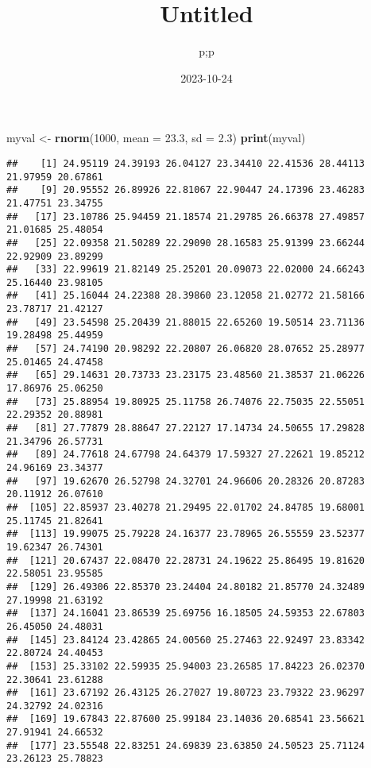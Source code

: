 \documentclass[
]{article}
\title{Untitled}
\author{p;p}
\date{2023-10-24}
\newenvironment{Shaded}{\begin{snugshade}}{\end{snugshade}}
\newcommand{\AttributeTok}[1]{\textcolor[rgb]{0.13,0.29,0.53}{#1}}
\newcommand{\DecValTok}[1]{\textcolor[rgb]{0.00,0.00,0.81}{#1}}
\newcommand{\FloatTok}[1]{\textcolor[rgb]{0.00,0.00,0.81}{#1}}
\newcommand{\FunctionTok}[1]{\textcolor[rgb]{0.13,0.29,0.53}{\textbf{#1}}}
\newcommand{\NormalTok}[1]{#1}
\newcommand{\OtherTok}[1]{\textcolor[rgb]{0.56,0.35,0.01}{#1}}
\begin{document}
\maketitle

\begin{Shaded}
\begin{Highlighting}[]
\NormalTok{myval }\OtherTok{\textless{}{-}} \FunctionTok{rnorm}\NormalTok{(}\DecValTok{1000}\NormalTok{, }\AttributeTok{mean =} \FloatTok{23.3}\NormalTok{, }\AttributeTok{sd =} \FloatTok{2.3}\NormalTok{)}
\FunctionTok{print}\NormalTok{(myval)}
\end{Highlighting}
\end{Shaded}

\begin{verbatim}
##    [1] 24.95119 24.39193 26.04127 23.34410 22.41536 28.44113 21.97959 20.67861
##    [9] 20.95552 26.89926 22.81067 22.90447 24.17396 23.46283 21.47751 23.34755
##   [17] 23.10786 25.94459 21.18574 21.29785 26.66378 27.49857 21.01685 25.48054
##   [25] 22.09358 21.50289 22.29090 28.16583 25.91399 23.66244 22.92909 23.89299
##   [33] 22.99619 21.82149 25.25201 20.09073 22.02000 24.66243 25.16440 23.98105
##   [41] 25.16044 24.22388 28.39860 23.12058 21.02772 21.58166 23.78717 21.42127
##   [49] 23.54598 25.20439 21.88015 22.65260 19.50514 23.71136 19.28498 25.44959
##   [57] 24.74190 20.98292 22.20807 26.06820 28.07652 25.28977 25.01465 24.47458
##   [65] 29.14631 20.73733 23.23175 23.48560 21.38537 21.06226 17.86976 25.06250
##   [73] 25.88954 19.80925 25.11758 26.74076 22.75035 22.55051 22.29352 20.88981
##   [81] 27.77879 28.88647 27.22127 17.14734 24.50655 17.29828 21.34796 26.57731
##   [89] 24.77618 24.67798 24.64379 17.59327 27.22621 19.85212 24.96169 23.34377
##   [97] 19.62670 26.52798 24.32701 24.96606 20.28326 20.87283 20.11912 26.07610
##  [105] 22.85937 23.40278 21.29495 22.01702 24.84785 19.68001 25.11745 21.82641
##  [113] 19.99075 25.79228 24.16377 23.78965 26.55559 23.52377 19.62347 26.74301
##  [121] 20.67437 22.08470 22.28731 24.19622 25.86495 19.81620 22.58051 23.95585
##  [129] 26.49306 22.85370 23.24404 24.80182 21.85770 24.32489 27.19998 21.63192
##  [137] 24.16041 23.86539 25.69756 16.18505 24.59353 22.67803 26.45050 24.48031
##  [145] 23.84124 23.42865 24.00560 25.27463 22.92497 23.83342 22.80724 24.40453
##  [153] 25.33102 22.59935 25.94003 23.26585 17.84223 26.02370 22.30641 23.61288
##  [161] 23.67192 26.43125 26.27027 19.80723 23.79322 23.96297 24.32792 24.02316
##  [169] 19.67843 22.87600 25.99184 23.14036 20.68541 23.56621 27.91941 24.66532
##  [177] 23.55548 22.83251 24.69839 23.63850 24.50523 25.71124 23.26123 25.78823

\end{verbatim}
\end{document}
